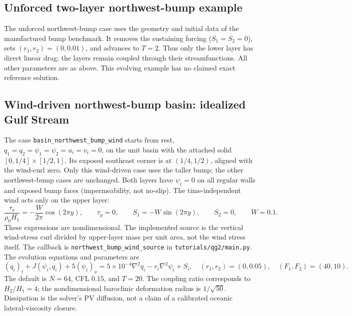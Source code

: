 \documentclass[11pt]{article}
\begin{document}
\subsection{Unforced two-layer northwest-bump example}

The unforced northwest-bump case uses the geometry and initial data of
the manufactured bump benchmark. It removes the
sustaining forcing ($S_1=S_2=0$), sets $(r_1,r_2)=(0,0.01)$,
and advances to $T=2$. Thus only the lower layer has direct linear drag;
the layers remain coupled through their streamfunctions. All other
parameters are as above. This evolving example has no claimed exact
reference solution.

\subsection{Wind-driven northwest-bump basin: idealized Gulf Stream}

The case \texttt{basin\_northwest\_bump\_wind} starts from rest,
$q_1=q_2=\psi_1=\psi_2=u_i=v_i=0$, on the unit basin with the
attached solid $[0,1/4]\times[1/2,1]$. Its exposed southeast corner
is at $(1/4,1/2)$, aligned with the wind-curl zero. Only this wind-driven
case uses the taller bump; the other northwest-bump cases are unchanged.
Both layers have $\psi_i=0$
on all regular walls and exposed bump faces (impermeability, not no-slip).
The time-independent wind acts only on the upper layer:
\[
 \frac{\tau_x}{\rho_0 H_1}=-\frac{W}{2\pi}\cos(2\pi y),\qquad
 \tau_y=0,\qquad S_1=-W\sin(2\pi y),\qquad S_2=0,\qquad W=0.1.
\]
These expressions are nondimensional. The implemented source is the
vertical wind-stress curl divided by upper-layer mass per unit area,
not the wind stress itself. The callback is
\texttt{northwest\_bump\_wind\_source} in \texttt{tutorials/qg2/main.py}.
The evolution equations and parameters are
\[
 (q_i)_t+J(\psi_i,q_i)+5(\psi_i)_x
 =5\times10^{-4}\nabla^2q_i-r_i\nabla^2\psi_i+S_i,
 \quad (r_1,r_2)=(0,0.05),\quad(F_1,F_2)=(40,10).
\]
The default is $N=64$, CFL $0.15$, and $T=20$. The coupling ratio
corresponds to $H_2/H_1=4$; the nondimensional baroclinic deformation
radius is $1/\sqrt{50}$. Dissipation is the solver's PV diffusion,
not a claim of a calibrated oceanic lateral-viscosity closure.
\end{document}
